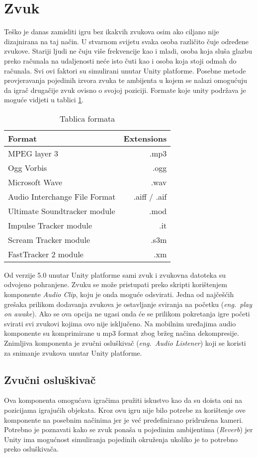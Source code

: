 \section{Zvuk}
Teško je danas zamisliti igru bez ikakvih zvukova osim ako ciljano nije dizajnirana na taj način. U stvarnom svijetu svaka osoba različito čuje određene zvukove. Stariji ljudi ne čuju više frekvencije kao i mladi, osoba koja sluša glazbu preko računala na udaljenosti neće isto čuti kao i osoba koja stoji odmah do računala. Svi ovi faktori su simulirani unutar Unity platforme. Posebne metode provjeravanja pojedinih izvora zvuka te ambijenta u kojem se nalazi omogućuju da igrač drugačije zvuk ovisno o svojoj poziciji. Formate koje unity podržava je moguće vidjeti u tablici \ref{table:tblFormati}.

\begin{center}
\begin{table}[h]
\large
\begin{tabular}{ l r } \hline	
	Format & Extensions \\
	\hline MPEG layer 3 & .mp3 \\
	 Ogg Vorbis  & .ogg \\
	 Microsoft Wave  & .wav \\
	 Audio Interchange File Format & .aiff / .aif \\
	Ultimate Soundtracker module  & .mod \\
	 Impulse Tracker module  & .it \\
	 Scream Tracker module & .s3m \\
	 FastTracker 2 module  & .xm \\
	 \hline
\end{tabular}
	\caption{Tablica formata}
	\label{table:tblFormati}
\end{table}
\end{center}
Od verzije 5.0 unutar Unity platforme sami zvuk i zvukovna datoteka su odvojeno pohranjene. Zvuku se može pristupati preko skripti korištenjem komponente \emph{Audio Clip}, koju je onda moguće odsvirati. Jedna od najčešćih grešaka prilikom dodavanja zvukova je ostavljanje sviranja na početku (\emph{eng.~play on awake}). Ako se ova opcija ne ugasi onda će se prilikom pokretanja igre početi svirati svi zvukovi kojima ovo nije isključeno. Na mobilnim uređajima audio komponente su komprimirane u mp3 format zbog bržeg načina dekompresije. Znimljiva komponenta je zvučni osluškivač (\emph{eng.~Audio Listener}) koji se koristi za snimanje zvukova unutar Unity platforme.
\newpage
\subsection{Zvučni osluškivač}
Ova komponenta omogućava igračima pružiti iskustvo kao da su doista oni na pozicijama igrajućih objekata. Kroz ovu igru nije bilo potrebe za korištenje ove komponente na posebnim načinima jer je već predefinirano pridružena kameri. Potrebno je poznavati kako se zvuk ponaša u pojedinim ambijentima (\emph{Reverb}) jer Unity ima mogućnost simuliranja pojedinih okruženja ukoliko je to potrebno preko osluškivača.

